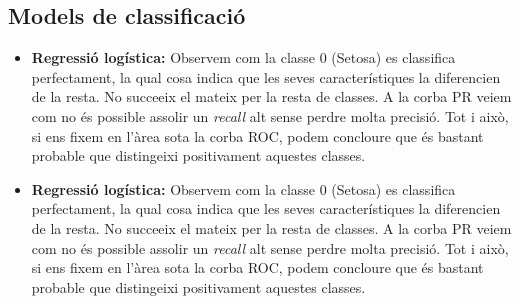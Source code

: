 \documentclass[a4paper, 11pt]{article}
\begin{document}
    \subsection{Models de classificació}
        \begin{itemize}
            \item \textbf{Regressió logística:}
                Observem com la classe 0 (Setosa) es classifica perfectament, la qual cosa indica que les seves característiques la diferencien de la resta. No succeeix el mateix per la resta de classes. A la corba PR veiem com no és possible assolir un \textit{recall} alt sense perdre molta precisió. Tot i això, si ens fixem en l'àrea sota la corba ROC, podem concloure que és bastant probable que distingeixi positivament aquestes classes. 
                
                \begin{figure}[H]%
                \centering
                \qquad
                \end{figure}
                
            \item \textbf{Regressió logística:}
                Observem com la classe 0 (Setosa) es classifica perfectament, la qual cosa indica que les seves característiques la diferencien de la resta. No succeeix el mateix per la resta de classes. A la corba PR veiem com no és possible assolir un \textit{recall} alt sense perdre molta precisió. Tot i això, si ens fixem en l'àrea sota la corba ROC, podem concloure que és bastant probable que distingeixi positivament aquestes classes. 
                
                \begin{figure}[H]%
                \centering
                \qquad
                \end{figure}

            
        \end{itemize}
\end{document}
